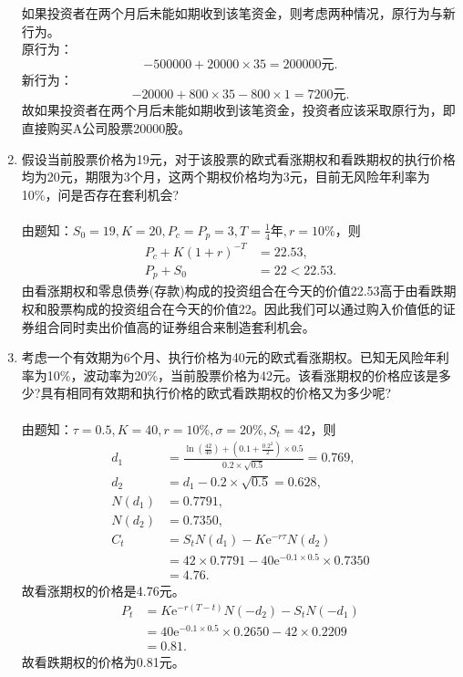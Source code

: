 \begin{enumerate}
\begin{enumerate}[label=(\arabic*)]
    \end{enumerate}
    如果投资者在两个月后未能如期收到该笔资金，则考虑两种情况，原行为与新行为。\\
    原行为：
    \[-500000 + 20000 \times 35 = 200000\text{元}.\]
    新行为：
    \[-20000 + 800\times 35 -800 \times 1 = 7200\text{元}.\]
    故如果投资者在两个月后未能如期收到该笔资金，投资者应该采取原行为，即直接购买A公司股票20000股。
    \item 假设当前股票价格为19元，对于该股票的欧式看涨期权和看跌期权的执行价格均为20元，期限为3个月，这两个期权价格均为3元，目前无风险年利率为10\%，问是否存在套利机会?\\
    \sol\\
    由题知：$\displaystyle S_0 = 19, K = 20, P_c = P_p = 3, T = \frac{1}{4}\text{年}, r = 10\%$，则
    \begin{align*}
        P_c + K(1 + r)^{-T} & = 22.53,\\
        P_p + S_0 & = 22 < 22.53.
    \end{align*}
    由看涨期权和零息债券(存款)构成的投资组合在今天的价值22.53高于由看跌期权和股票构成的投资组合在今天的价值22。因此我们可以通过购入价值低的证券组合同时卖出价值高的证券组合来制造套利机会。
    \item 考虑一个有效期为6个月、执行价格为40元的欧式看涨期权。已知无风险年利率为10\%，波动率为20\%，当前股票价格为42元。该看涨期权的价格应该是多少?具有相同有效期和执行价格的欧式看跌期权的价格又为多少呢?\\
    \sol\\
    由题知：$\tau = 0.5, K = 40, r = 10\%, \sigma = 20\%, S_t = 42$，则
    \begin{align*}
        d_1 & = \frac{\ln \left(\frac{42}{40}\right) + \left(0.1 + \frac{0.2^2}{2}\right) \times 0.5}{0.2 \times \sqrt{0.5}} = 0.769,\\
        d_2 & = d_1 - 0.2 \times \sqrt{0.5} = 0.628,\\
        N(d_1) & = 0.7791,\\
        N(d_2) & = 0.7350,\\
        C_t & = S_tN(d_1) - K \mathrm{e}^{-r \tau}N(d_2)\\
        & = 42 \times 0.7791 - 40\mathrm{e}^{-0.1 \times 0.5} \times 0.7350\\
        & = 4.76.
    \end{align*}
    故看涨期权的价格是4.76元。
    \begin{align*}
        P_t & = K\mathrm{e}^{-r(T-t)}N(-d_2)-S_tN(-d_1)\\
        & = 40\mathrm{e}^{-0.1 \times 0.5} \times 0.2650 - 42 \times 0.2209\\
        & = 0.81.
    \end{align*}
    故看跌期权的价格为0.81元。
\end{enumerate}
\clearpage